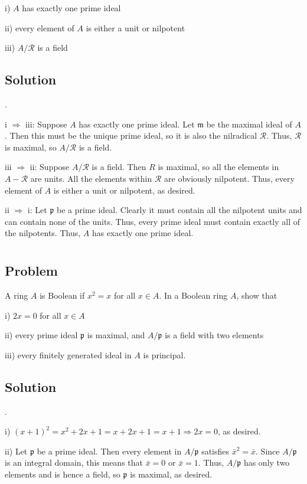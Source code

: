 \documentclass[book,12pt,oneside,openany]{memoir}
\begin{document}
i) $A$ has exactly one prime ideal

ii) every element of $A$ is either a unit or nilpotent

iii) $A/\mathcal{R}$ is a field
\subsection{Solution}
.

i $\Rightarrow$ iii: Suppose $A$ has exactly one prime ideal. Let $\mathfrak{m}$ be the maximal ideal of $A$. Then this must be the unique prime ideal, so it is also the nilradical $\mathcal{R}$. Thus, $\mathcal{R}$ is maximal, so $A/\mathcal{R}$ is a field.

iii $\Rightarrow$ ii: Suppose $A/\mathcal{R}$ is a field. Then $R$ is maximal, so all the elements in $A - \mathcal{R}$ are units. All the elements within $\mathcal{R}$ are obviously nilpotent. Thus, every element of $A$ is either a unit or nilpotent, as desired.

ii $\Rightarrow$ i: Let $\mathfrak{p}$ be a prime ideal. Clearly it must contain all the nilpotent units and can contain none of the units. Thus, every prime ideal must contain exactly all of the nilpotents. Thus, $A$ has exactly one prime ideal.



\section{}
\subsection{Problem}
A ring $A$ is Boolean if $x^2 = x$ for all $x \in A$. In a Boolean ring $A$, show that 

i) $2x = 0$ for all $x \in A$

ii) every prime ideal $\mathfrak{p}$ is maximal, and $A/\mathfrak{p}$ is a field with two elements

iii) every finitely generated ideal in $A$ is principal.
\subsection{Solution}

.

i) $(x +1)^2 = x^2 + 2x + 1 = x + 2x + 1 = x + 1 \Rightarrow 2x = 0$, as desired.

ii) Let $\mathfrak{p}$ be a prime ideal. Then every element in $A/\mathfrak{p}$ satisfies $\bar{x}^2 = \bar{x}$. Since $A/\mathfrak{p}$ is an integral domain, this means that $\bar{x} = 0$ or $\bar{x} = 1$. Thus, $A/\mathfrak{p}$ has only two elements and is hence a field, so $\mathfrak{p}$ is maximal, as desired.
\end{document}
